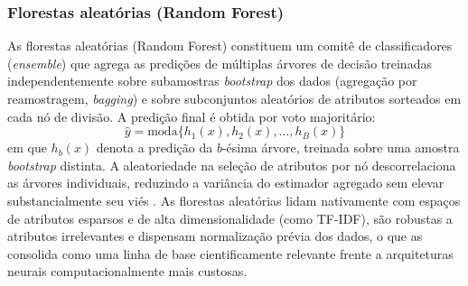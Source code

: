 \subsubsection{Florestas aleatórias (Random Forest)}
As florestas aleatórias (Random Forest) \cite{breiman2001random} constituem um comitê de classificadores (\textit{ensemble}) que agrega as predições de múltiplas árvores de decisão treinadas independentemente sobre subamostras \textit{bootstrap} dos dados (agregação por reamostragem, \textit{bagging}) e sobre subconjuntos aleatórios de atributos sorteados em cada nó de divisão. A predição final é obtida por voto majoritário:
\begin{equation}
	\hat{y} = \text{moda}\{h_1(x), h_2(x), \dots, h_B(x)\}
\end{equation}
em que $h_b(x)$ denota a predição da $b$-ésima árvore, treinada sobre uma amostra \textit{bootstrap} distinta. A aleatoriedade na seleção de atributos por nó descorrelaciona as árvores individuais, reduzindo a variância do estimador agregado sem elevar substancialmente seu viés \cite{breiman2001random}. As florestas aleatórias lidam nativamente com espaços de atributos esparsos e de alta dimensionalidade (como TF-IDF), são robustas a atributos irrelevantes e dispensam normalização prévia dos dados, o que as consolida como uma linha de base cientificamente relevante frente a arquiteturas neurais computacionalmente mais custosas.

